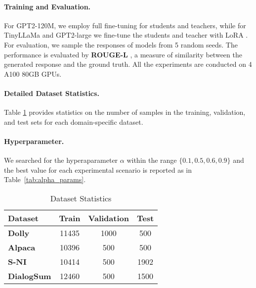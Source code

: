 \paragraph{Training and Evaluation.}
For GPT2-120M, we employ full fine-tuning for students and teachers, while for TinyLLaMa and GPT2-large we fine-tune the students and teacher with LoRA \cite{hu2021lora}. For evaluation, we sample the responses of models from 5 random seeds. The performance is evaluated by \textbf{ROUGE-L} \cite{lin2004rouge}, a measure of similarity between the generated response and the ground truth. All the experiments are conducted on 4 A100 80GB GPUs.

\paragraph{Detailed Dataset Statistics.} Table \ref{tab:dataset} provides statistics on the number of samples in the training, validation, and test sets for each domain-specific dataset.

\paragraph{Hyperparameter.} 

We searched for the hyperaparameter $\alpha$ within the range \(\{0.1, 0.5, 0.6, 0.9\}\) and the best value for each experimental scenario is reported as in Table~\ref{tab:alpha_params}.



\begin{table}[ht]
\centering
\begin{adjustbox}{width=0.35\textwidth}
\begin{tabular}{l|c|c|c}
\toprule
Dataset   & Train & Validation & Test \\ \midrule
\textbf{Dolly}   & 11435 & 1000 & 500 \\
\textbf{Alpaca}   & 10396 & 500 & 500 \\
\textbf{S-NI}   & 10414 & 500 & 1902 \\
\textbf{DialogSum}   & 12460 & 500 & 1500\\ 
\bottomrule

\end{tabular}
\end{adjustbox}
\caption{Dataset Statistics}
\label{tab:dataset}
\end{table}



